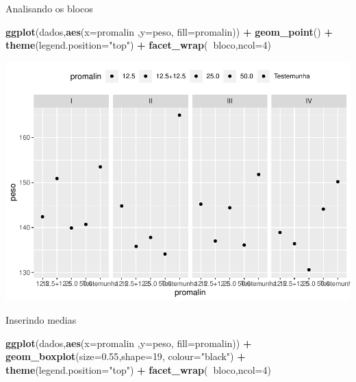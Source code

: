 \documentclass[]{book}
\newenvironment{Shaded}{\begin{snugshade}}{\end{snugshade}}
\newcommand{\DataTypeTok}[1]{\textcolor[rgb]{0.13,0.29,0.53}{#1}}
\newcommand{\DecValTok}[1]{\textcolor[rgb]{0.00,0.00,0.81}{#1}}
\newcommand{\FloatTok}[1]{\textcolor[rgb]{0.00,0.00,0.81}{#1}}
\newcommand{\KeywordTok}[1]{\textcolor[rgb]{0.13,0.29,0.53}{\textbf{#1}}}
\newcommand{\NormalTok}[1]{#1}
\newcommand{\OperatorTok}[1]{\textcolor[rgb]{0.81,0.36,0.00}{\textbf{#1}}}
\newcommand{\StringTok}[1]{\textcolor[rgb]{0.31,0.60,0.02}{#1}}
\begin{document}
Analisando os blocos

\begin{Shaded}
\begin{Highlighting}[]
\KeywordTok{ggplot}\NormalTok{(dados,}\KeywordTok{aes}\NormalTok{(}\DataTypeTok{x=}\NormalTok{promalin ,}\DataTypeTok{y=}\NormalTok{peso, }\DataTypeTok{fill=}\NormalTok{promalin)) }\OperatorTok{+}\StringTok{ }
\StringTok{       }\KeywordTok{geom_point}\NormalTok{() }\OperatorTok{+}\StringTok{ }
\StringTok{       }\KeywordTok{theme}\NormalTok{(}\DataTypeTok{legend.position=}\StringTok{"top"}\NormalTok{) }\OperatorTok{+}\StringTok{ }
\StringTok{       }\KeywordTok{facet_wrap}\NormalTok{(}\OperatorTok{~}\NormalTok{bloco,}\DataTypeTok{ncol=}\DecValTok{4}\NormalTok{)}
\end{Highlighting}
\end{Shaded}

\includegraphics{TudodoR_files/figure-latex/unnamed-chunk-233-1.pdf}

Inserindo medias

\begin{Shaded}
\begin{Highlighting}[]
\KeywordTok{ggplot}\NormalTok{(dados,}\KeywordTok{aes}\NormalTok{(}\DataTypeTok{x=}\NormalTok{promalin ,}\DataTypeTok{y=}\NormalTok{peso, }\DataTypeTok{fill=}\NormalTok{promalin)) }\OperatorTok{+}\StringTok{ }
\StringTok{  }\KeywordTok{geom_boxplot}\NormalTok{(}\DataTypeTok{size=}\FloatTok{0.55}\NormalTok{,}\DataTypeTok{shape=}\DecValTok{19}\NormalTok{, }\DataTypeTok{colour=}\StringTok{"black"}\NormalTok{) }\OperatorTok{+}\StringTok{ }
\StringTok{  }\KeywordTok{theme}\NormalTok{(}\DataTypeTok{legend.position=}\StringTok{"top"}\NormalTok{) }\OperatorTok{+}\StringTok{ }
\StringTok{  }\KeywordTok{facet_wrap}\NormalTok{(}\OperatorTok{~}\NormalTok{bloco,}\DataTypeTok{ncol=}\DecValTok{4}\NormalTok{) }
\end{Highlighting}
\end{Shaded}
\end{document}
